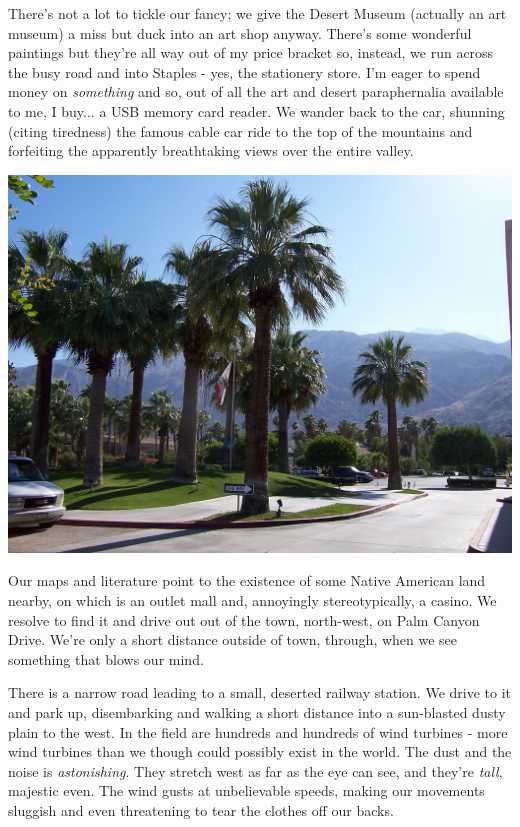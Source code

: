 \documentclass[a5paper,titlepage,11pt]{book}
\begin{document}
There's not a lot to tickle our fancy; we give the Desert Museum (actually an art museum) a miss but duck into an art shop anyway. There's some wonderful paintings but they're all way out of my price bracket so, instead, we run across the busy road and into Staples - yes, the stationery store. I'm eager to spend money on \emph{something} and so, out of all the art and desert paraphernalia available to me, I buy... a USB memory card reader. We wander back to the car, shunning (citing tiredness) the famous cable car ride to the top of the mountains and forfeiting the apparently breathtaking views over the entire valley.

\begin{center}\includegraphics[width=\textwidth]{gfx/100_1625}\end{center}

Our maps and literature point to the existence of some Native American land nearby, on which is an outlet mall and, annoyingly stereotypically, a casino. We resolve to find it and drive out out of the town, north-west, on Palm Canyon Drive. We're only a short distance outside of town, through, when we see something that blows our mind.

There is a narrow road leading to a small, deserted railway station. We drive to it and park up, disembarking and walking a short distance into a sun-blasted dusty plain to the west. In the field are hundreds and hundreds of wind turbines - more wind turbines than we though could possibly exist in the world. The dust and the noise is \emph{astonishing}. They stretch west as far as the eye can see, and they're \emph{tall}, majestic even. The wind gusts at unbelievable speeds, making our movements sluggish and even threatening to tear the clothes off our backs.
\end{document}
